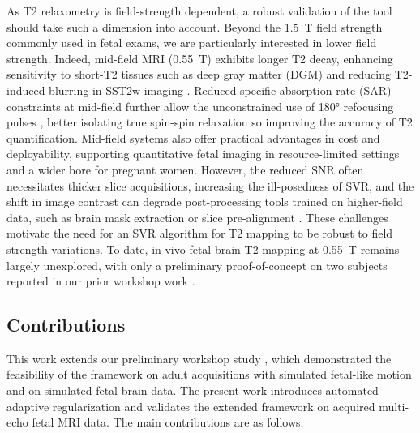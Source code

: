 \documentclass[preprint,authoryear,12pt]{elsarticle}
\begin{document}
As T2 relaxometry is field-strength dependent, a robust validation of the tool should take such a dimension into account.
Beyond the 1.5~T field strength commonly used in fetal exams, we are particularly interested in lower field strength.
Indeed, mid-field MRI (0.55~T) exhibits longer T2 decay, enhancing sensitivity to short-T2 tissues such as deep gray matter (DGM) \citep{payette_t2_2025, marques_lowfield_2019} and reducing T2-induced blurring in SST2w imaging \citep{qin_point_2012}. Reduced specific absorption rate (SAR) constraints at mid-field further allow the unconstrained use of 180° refocusing pulses \citep{krishnamurthy_mr_2015}, better isolating true spin-spin relaxation so improving the accuracy of T2 quantification. Mid-field systems also offer practical advantages in cost and deployability, supporting quantitative fetal imaging in resource-limited settings \citep{arnold_lowfield_2023} and a wider bore for pregnant women. However, the reduced SNR often necessitates thicker slice acquisitions, increasing the ill-posedness of SVR, and the shift in image contrast can degrade post-processing tools trained on higher-field data, such as brain mask extraction \citep{faghihpirayesh2024fetal} or slice pre-alignment \citep{xu_svort_2022}. These challenges motivate the need for an SVR algorithm for T2 mapping to be robust to field strength variations. To date, in-vivo fetal brain T2 mapping at 0.55~T remains largely unexplored, with only a preliminary proof-of-concept on two subjects reported in our prior workshop work \citep{bulut_physics-informed_2025}.

\subsection{Contributions}

This work extends our preliminary workshop study \citep{bulut_physics-informed_2025}, which demonstrated the feasibility of the framework on adult acquisitions with simulated fetal-like motion and on simulated fetal brain data. The present work introduces automated adaptive regularization and validates the extended framework on acquired multi-echo fetal MRI data. The main contributions are as follows:
\end{document}
